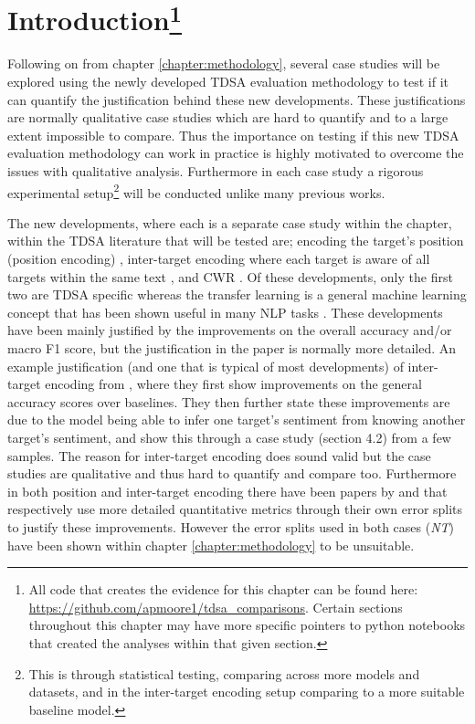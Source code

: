 \FloatBarrier
\section[Introduction]{Introduction\footnote{All code that creates the evidence for this chapter can be found here: \url{https://github.com/apmoore1/tdsa_comparisons}. Certain sections throughout this chapter may have more specific pointers to python notebooks that created the analyses within that given section.}}
\label{section_case_intro}
Following on from chapter \ref{chapter:methodology}, several case studies will be explored using the newly developed TDSA evaluation methodology to test if it can quantify the justification behind these new developments. These justifications are normally qualitative case studies which are hard to quantify and to a large extent impossible to compare. Thus the importance on testing if this new TDSA evaluation methodology can work in practice is highly motivated to overcome the issues with qualitative analysis. Furthermore in each case study a rigorous experimental setup\footnote{This is through statistical testing, comparing across more models and datasets, and in the inter-target encoding setup comparing to a more suitable baseline model.} will be conducted unlike many previous works.

The new developments, where each is a separate case study within the chapter, within the TDSA literature that will be tested are; encoding the target's position (position encoding) \citep{gu-etal-2018-position}, inter-target encoding where each target is aware of all targets within the same text \citep{hazarika-etal-2018-modeling}, and CWR \citep{sun-etal-2019-utilizing,xu-etal-2019-bert}. Of these developments, only the first two are TDSA specific whereas the transfer learning is a general machine learning concept that has been shown useful in many NLP tasks \citep{peters-etal-2018-deep}. These developments have been mainly justified by the improvements on the overall accuracy and/or macro F1 score, but the justification in the paper is normally more detailed. An example justification (and one that is typical of most developments) of inter-target encoding from \citet{hazarika-etal-2018-modeling}, where they first show improvements on the general accuracy scores over baselines. They then further state these improvements are due to the model being able to infer one target's sentiment from knowing another target's sentiment, and show this through a case study (section 4.2) from a few samples. The reason for inter-target encoding does sound valid but the case studies are qualitative and thus hard to quantify and compare too. Furthermore in both position and inter-target encoding there have been papers by \citet{he-etal-2018-effective} and \citet{majumder-etal-2018-iarm} that respectively use more detailed quantitative metrics through their own error splits to justify these improvements. However the error splits used in both cases (\textit{NT}) have been shown within chapter \ref{chapter:methodology} to be unsuitable.

